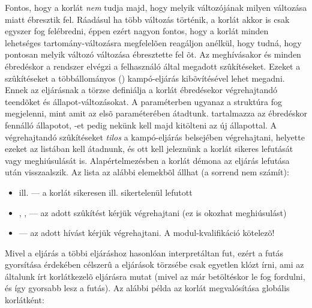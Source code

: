 Fontos, hogy a korlát \emph{nem} tudja majd, hogy melyik változójának milyen
változása miatt ébresztik fel. Ráadásul ha több változás történik, a korlát
akkor is csak egyszer fog felébredni, éppen ezért nagyon fontos, hogy a
korlát minden lehetséges tartomány-változásra megfelelõen reagáljon anélkül,
hogy tudná, hogy pontosan melyik változó változása ébresztette fel õt.
\br
Az  meghívásakor és minden ébredéskor a rendszer elvégzi a
felhasználó által megadott szûkítéseket. Ezeket a szûkítéseket a
 többállományos () kampó-eljárás
kibõvítésével lehet megadni.
\br
{}\\
Ennek az eljárásnak a törzse definiálja a  korlát ébredésekor
végrehajtandó teendõket és állapot-változásokat. A  paraméterben
ugyanaz a struktúra fog megjelenni, mint amit az  elsõ
paraméterében átadtunk.  tartalmazza az ébredéskor fennálló állapotot,
-et pedig nekünk kell majd kitölteni az új állapottal. A végrehajtandó
szûkítéseket \emph{tilos} a kampó-eljárás belsejében végrehajtani, helyette ezeket
az  listában kell átadnunk, és ott kell jeleznünk a korlát sikeres
lefutását vagy meghiúsulását is. Alapértelmezésben a korlát démona az eljárás
lefutása után visszaalszik.
\br
Az  lista az alábbi elemekbõl állhat (a sorrend nem számít):

\begin{itemize}
\item {} ill.  --- a korlát sikeresen ill. sikertelenül lefutott
\item {}, ,  --- az adott szûkítést kérjük végrehajtani
(ez is okozhat meghiúsulást)
\item {} --- az adott hívást kérjük végrehajtani. A
 modul-kvalifikáció kötelezõ!
\end{itemize}

Mivel a  eljárás a többi  eljáráshoz hasonlóan
interpretáltan fut, ezért a futás gyorsítása érdekében célszerû a 
eljárások törzsébe csak egyetlen klózt írni, ami az általunk írt korlátkezelõ eljárásra
mutat (mivel az már betöltéskor le fog fordulni, és így gyorsabb lesz a futás).
\br
Az alábbi példa az  korlát megvalósítása globális korlátként:

